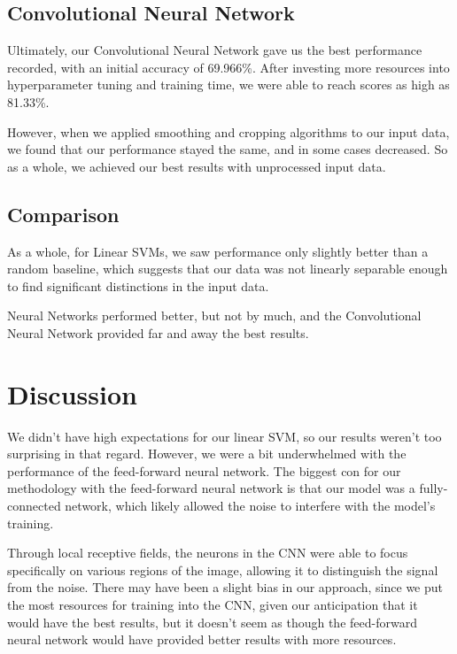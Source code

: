 \documentclass[conference]{IEEEtran}
\begin{document}
\subsection{Convolutional Neural Network}

Ultimately, our Convolutional Neural Network gave us the best performance recorded, with an initial accuracy of 69.966\%. After investing more resources into hyperparameter tuning and training time, we were able to reach scores as high as 81.33\%.

However, when we applied smoothing and cropping algorithms to our input data, we found that our performance stayed the same, and in some cases decreased. So as a whole, we achieved our best results with unprocessed input data.

\subsection{Comparison}

As a whole, for Linear SVMs, we saw performance only slightly better than a random baseline, which suggests that our data was not linearly separable enough to find significant distinctions in the input data.

Neural Networks performed better, but not by much, and the Convolutional Neural Network provided far and away the best results.

\section{\textbf{Discussion}}

We didn't have high expectations for our linear SVM, so our results weren't too surprising in that regard. However, we were a bit underwhelmed with the performance of the feed-forward neural network. The biggest con for our methodology with the feed-forward neural network is that our model was a fully-connected network, which likely allowed the noise to interfere with the model's training.

Through local receptive fields, the neurons in the CNN were able to focus specifically on various regions of the image, allowing it to distinguish the signal from the noise. There may have been a slight bias in our approach, since we put the most resources for training into the CNN, given our anticipation that it would have the best results, but it doesn't seem as though the feed-forward neural network would have provided better results with more resources.
\end{document}
